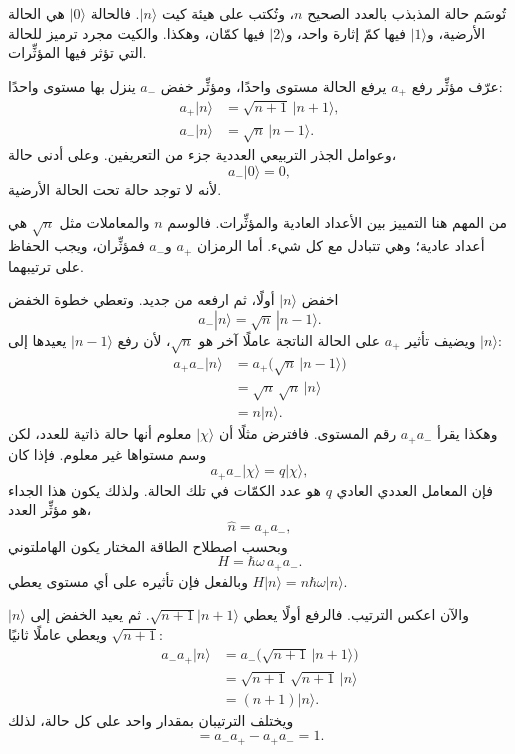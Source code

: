 تُوسَم حالة المذبذب بالعدد الصحيح \(n\)، وتُكتب على هيئة كيت \(|n\rangle\). فالحالة \(|0\rangle\) هي الحالة الأرضية، و\(|1\rangle\) فيها كمّ إثارة واحد، و\(|2\rangle\) فيها كمّان، وهكذا. والكيت مجرد ترميز للحالة التي تؤثر فيها المؤثِّرات.

عرّف مؤثِّر رفع \(a_+\) يرفع الحالة مستوى واحدًا، ومؤثِّر خفض \(a_-\) ينزل بها مستوى واحدًا:
\begin{align}
a_+|n\rangle &= \sqrt{n+1}\,|n+1\rangle,\\
a_-|n\rangle &= \sqrt{n}\,|n-1\rangle.
\end{align}
وعوامل الجذر التربيعي العددية جزء من التعريفين. وعلى أدنى حالة،
\begin{equation}
a_-|0\rangle=0,
\end{equation}
لأنه لا توجد حالة تحت الحالة الأرضية.

من المهم هنا التمييز بين الأعداد العادية والمؤثِّرات. فالوسم \(n\) والمعاملات مثل \(\sqrt n\) هي أعداد عادية؛ وهي تتبادل مع كل شيء. أما الرمزان \(a_+\) و\(a_-\) فمؤثِّران، ويجب الحفاظ على ترتيبهما.

اخفض \(|n\rangle\) أولًا، ثم ارفعه من جديد. وتعطي خطوة الخفض
\begin{equation}
a_-|n\rangle=\sqrt n\,|n-1\rangle.
\end{equation}
ويضيف تأثير \(a_+\) على الحالة الناتجة عاملًا آخر هو \(\sqrt n\)، لأن رفع \(|n-1\rangle\) يعيدها إلى \(|n\rangle\):
\begin{align}
a_+a_-|n\rangle
&=a_+\bigl(\sqrt n\,|n-1\rangle\bigr)\\
&=\sqrt n\,\sqrt n\,|n\rangle\\
&=n|n\rangle.
\end{align}
وهكذا يقرأ \(a_+a_-\) رقم المستوى. فافترض مثلًا أن \(|\chi\rangle\) معلوم أنها حالة ذاتية للعدد، لكن وسم مستواها غير معلوم. فإذا كان
\begin{equation}
a_+a_-|\chi\rangle=q|\chi\rangle,
\end{equation}
فإن المعامل العددي العادي \(q\) هو عدد الكمّات في تلك الحالة. ولذلك يكون هذا الجداء هو مؤثِّر العدد،
\begin{equation}
\hat n=a_+a_-,
\end{equation}
وبحسب اصطلاح الطاقة المختار يكون الهاملتوني
\begin{equation}
H=\hbar\omega\,a_+a_-.
\end{equation}
وبالفعل فإن تأثيره على أي مستوى يعطي \(H|n\rangle=n\hbar\omega|n\rangle\).

والآن اعكس الترتيب. فالرفع أولًا يعطي \(\sqrt{n+1}|n+1\rangle\). ثم يعيد الخفض إلى \(|n\rangle\) ويعطي عاملًا ثانيًا \(\sqrt{n+1}\):
\begin{align}
a_-a_+|n\rangle
&=a_-\bigl(\sqrt{n+1}\,|n+1\rangle\bigr)\\
&=\sqrt{n+1}\,\sqrt{n+1}\,|n\rangle\\
&=(n+1)|n\rangle.
\end{align}
ويختلف الترتيبان بمقدار واحد على كل حالة، لذلك
\begin{equation}
[a_-,a_+]=a_-a_+-a_+a_-=1.
\end{equation}

